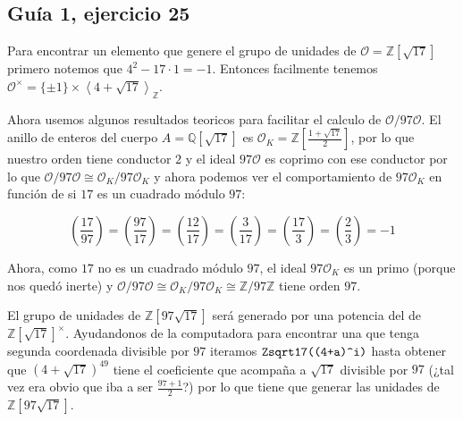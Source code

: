 \documentclass[12pt]{amsart}
\DeclareMathOperator{\mcd}{mcd}
\newcommand{\QQ}{\mathbb{Q}}
\newcommand{\ZZ}{\mathbb{Z}}
\newcommand{\OO}{\mathcal{O}}
\newcommand{\leg}[2]{\left( \frac{#1}{#2} \right)}
\newcommand{\lc}{\left<}
\newcommand{\rc}{\right>}
\theoremstyle{plain}
\begin{document}















\subsection*{Guía 1, ejercicio 25}

Para encontrar un elemento que genere el grupo de unidades de
$\OO=\ZZ[\sqrt{17}]$ primero notemos que $4^2-17\cdot 1=-1$. 
Entonces facilmente tenemos $\OO^\times = \{\pm 1\} \times 
\lc4+\sqrt{17}\rc_\ZZ$. 

Ahora usemos algunos resultados teoricos para facilitar el calculo de 
$\OO / 97\OO$. El anillo de enteros del cuerpo $A=\QQ[\sqrt{17}]$ es 
$\OO_K = \ZZ[\frac{1+\sqrt{17}}{2}]$, por lo que nuestro
orden tiene conductor $2$ y el ideal $97\OO$ es coprimo con ese conductor
por lo que $\OO /97\OO \cong \OO_K / 97 \OO_K$
y ahora podemos ver el comportamiento de $97\OO_K$
en función de si $17$ es un cuadrado módulo $97$:

$$\leg{17}{97} = \leg{97}{17} = \leg{12}{17} = \leg{3}{17} =
\leg{17}{3} = \leg{2}{3} = -1$$

Ahora, como $17$ no es un cuadrado módulo $97$, el ideal 
$97\OO_K$ es un primo (porque nos quedó inerte)
y $\OO/97\OO \cong \OO_K / 97\OO_K \cong\ZZ/97\ZZ$ tiene orden $97$.

El grupo de unidades de $\ZZ[97\sqrt{17}]$ será generado por
una potencia del de $\ZZ[\sqrt{17}]^\times$. Ayudandonos de la 
computadora para encontrar una que tenga segunda coordenada divisible
por $97$ iteramos $\verb|Zsqrt17((4+a)^i)|$ hasta obtener que 
$(4+\sqrt{17})^{49}$ tiene el coeficiente que acompaña a $\sqrt{17}$
divisible por $97$ (¿tal vez era obvio que iba a ser $\frac{97+1}{2}$?)
por lo que tiene que generar las unidades de $\ZZ[97\sqrt{17}]$.
\end{document}
